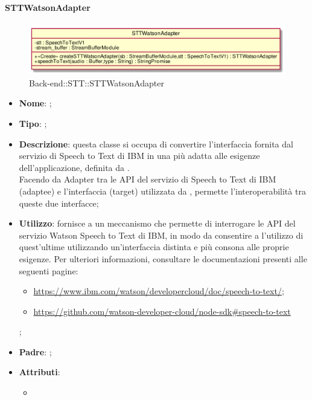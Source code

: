 \hypertarget{STTWatsonAdapter_label}{\paragraph{STTWatsonAdapter}}
\begin{figure}[h]
	\centering
	\includegraphics[width=\textwidth,height=\textheight,keepaspectratio]{images/ClassSTTWatsonAdapter.png}
	\caption{Back-end::STT::STTWatsonAdapter}
\end{figure}
\begin{itemize}
	\item \textbf{Nome}: ;
	\item \textbf{Tipo}: ;
	\item \textbf{Descrizione}: questa classe si occupa di convertire l'interfaccia fornita dal servizio di Speech to Text di IBM in una più adatta alle esigenze dell'applicazione, definita da . \\
Facendo da Adapter tra le API del servizio di Speech to Text di IBM (adaptee) e l'interfaccia  (target) utilizzata da , permette l'interoperabilità tra queste due interfacce;
	\item \textbf{Utilizzo}: fornisce a  un meccanismo che permette di interrogare le API del servizio Watson Speech to Text di IBM, in modo da consentire a  l'utilizzo di quest'ultime utilizzando un'interfaccia distinta e più consona alle proprie esigenze.
Per ulteriori informazioni, consultare le documentazioni presenti alle seguenti pagine:
\begin{itemize}
    \item \url{https://www.ibm.com/watson/developercloud/doc/speech-to-text/};
    \item \url{https://github.com/watson-developer-cloud/node-sdk#speech-to-text}
\end{itemize};
	\item \textbf{Padre}: ;
	\item \textbf{Attributi}:
	\begin{itemize}
		\item[]  \\

\end{itemize}
\end{itemize}

